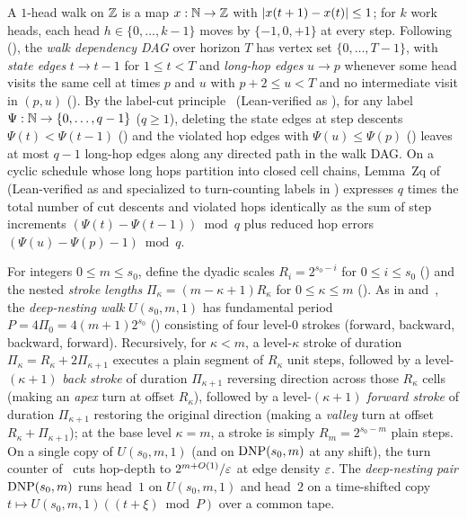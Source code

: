 A $1$-head walk on $\mathbb{Z}$ is a map $x : \mathbb{N} \to \mathbb{Z}$ with $\lvert x(t+1) - x(t) \rvert \le 1$; for $k$ work heads, each head $h \in
\{0, \dots, k-1\}$ moves by $\{-1, 0, +1\}$ at every step. Following~\cite[Section~2.3]{EighthPaper2026}
(), the \emph{walk dependency DAG} over horizon $T$ has vertex set $\{0, \dots, T-1\}$,
with \emph{state edges} $t \to t - 1$ for $1 \le t < T$ and \emph{long-hop edges} $u \to p$ whenever some head visits the
same cell at times $p$ and $u$ with $p + 2 \le u < T$ and no intermediate visit in $(p, u)$ ().
By the label-cut principle~\cite[Section~2.3, Lemma~2.3]{EighthPaper2026} (Lean-verified as
), for any label $\Psi : \mathbb{N} \to \{0, \dots, q-1\}$ ($q \ge 1$), deleting the
state edges at step descents $\Psi(t) < \Psi(t-1)$ () and the violated hop edges with
$\Psi(u) \le \Psi(p)$ () leaves at most $q - 1$ long-hop edges along any directed path in
the walk DAG. On a cyclic schedule whose long hops partition into closed cell chains, Lemma~Zq
of~\cite[Section~5.5, Lemma~5.15]{FourthPaper2026} (Lean-verified as  and specialized to
turn-counting labels in ) expresses $q$ times the total number of cut descents and
violated hops identically as the sum of step increments $(\Psi(t) - \Psi(t-1)) \bmod q$ plus reduced hop errors
$(\Psi(u) - \Psi(p) - 1) \bmod q$.

For integers $0 \le m \le s_0$, define the dyadic scales $R_i = 2^{s_0 - i}$ for $0 \le i \le s_0$ () and the
nested \emph{stroke lengths} $\Pi_\kappa = (m - \kappa + 1) R_\kappa$ for $0 \le \kappa \le m$ (). As in
\cite[Definition~5.3]{FourthPaper2026} and~\cite[Section~2.5]{EighthPaper2026}, the \emph{deep-nesting walk} $U(s_0, m, 1)$ has fundamental period
$P = 4 \Pi_0 = 4(m+1)2^{s_0}$ () consisting of four level-$0$ strokes (forward, backward, backward,
forward). Recursively, for $\kappa < m$, a level-$\kappa$ stroke of duration $\Pi_\kappa = R_\kappa + 2 \Pi_{\kappa+1}$
executes a plain segment of $R_\kappa$ unit steps, followed by a level-$(\kappa+1)$ \emph{back stroke} of duration
$\Pi_{\kappa+1}$ reversing direction across those $R_\kappa$ cells (making an \emph{apex} turn at offset $R_\kappa$),
followed by a level-$(\kappa+1)$ \emph{forward stroke} of duration $\Pi_{\kappa+1}$ restoring the original direction (making
a \emph{valley} turn at offset $R_\kappa + \Pi_{\kappa+1}$); at the base level $\kappa = m$, a stroke is simply $R_m =
2^{s_0 - m}$ plain steps. On a single copy of $U(s_0, m, 1)$ (and on $\mathrm{DNP}(s_0, m)$ at any shift), the turn counter
of~\cite[Section~5.2, Theorem~5.2 and Corollary~5.5]{EighthPaper2026} cuts hop-depth to $2^{m + O(1)}/\varepsilon$ at edge density
$\varepsilon$. The \emph{deep-nesting pair} $\mathrm{DNP}(s_0, m)$ runs head~$1$ on $U(s_0, m, 1)$ and head~$2$ on a time-shifted copy
$t \mapsto U(s_0, m, 1)((t + \xi) \bmod P)$ over a common tape.

